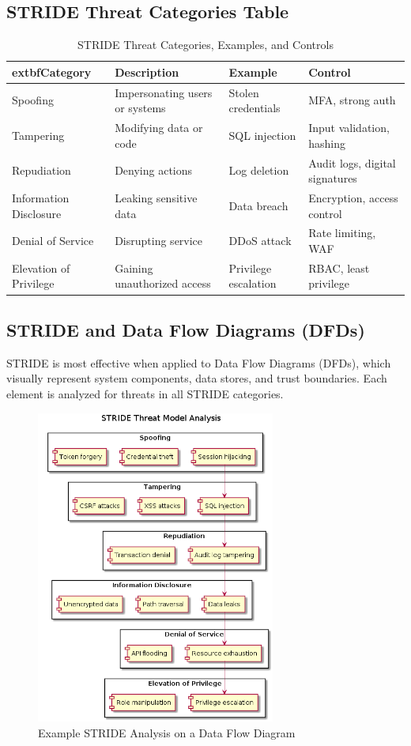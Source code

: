 \subsection*{STRIDE Threat Categories Table}
\begin{table}[H]
\centering
\begin{tabular}{|l|l|l|l|}
\hline
	extbf{Category} & \textbf{Description} & \textbf{Example} & \textbf{Control} \\
\hline
Spoofing & Impersonating users or systems & Stolen credentials & MFA, strong auth \\
Tampering & Modifying data or code & SQL injection & Input validation, hashing \\
Repudiation & Denying actions & Log deletion & Audit logs, digital signatures \\
Information Disclosure & Leaking sensitive data & Data breach & Encryption, access control \\
Denial of Service & Disrupting service & DDoS attack & Rate limiting, WAF \\
Elevation of Privilege & Gaining unauthorized access & Privilege escalation & RBAC, least privilege \\
\hline
\end{tabular}
\caption{STRIDE Threat Categories, Examples, and Controls\cite{shostack2014,owasp}}
\end{table}

\subsection*{STRIDE and Data Flow Diagrams (DFDs)}
STRIDE is most effective when applied to Data Flow Diagrams (DFDs), which visually represent system components, data stores, and trust boundaries. Each element is analyzed for threats in all STRIDE categories.\cite{shostack2014}

\begin{figure}[H]
	\centering
	\includegraphics[width=0.7\textwidth]{images/stride-analysis}
	\caption{Example STRIDE Analysis on a Data Flow Diagram}
\end{figure}

